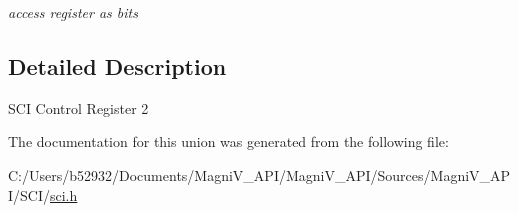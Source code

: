 \begin{DoxyCompactItemize}
\begin{tabbing}
\end{tabbing}\begin{DoxyCompactList}\small\item\em access register as bits \end{DoxyCompactList}\end{DoxyCompactItemize}


\subsection{Detailed Description}

\begin{DoxyItemize}
\item S\+C\+I Control Register 2 
\end{DoxyItemize}

The documentation for this union was generated from the following file\+:\begin{DoxyCompactItemize}
\item 
C\+:/\+Users/b52932/\+Documents/\+Magni\+V\+\_\+\+A\+P\+I/\+Magni\+V\+\_\+\+A\+P\+I/\+Sources/\+Magni\+V\+\_\+\+A\+P\+I/\+S\+C\+I/\hyperlink{sci_8h}{sci.\+h}\end{DoxyCompactItemize}
